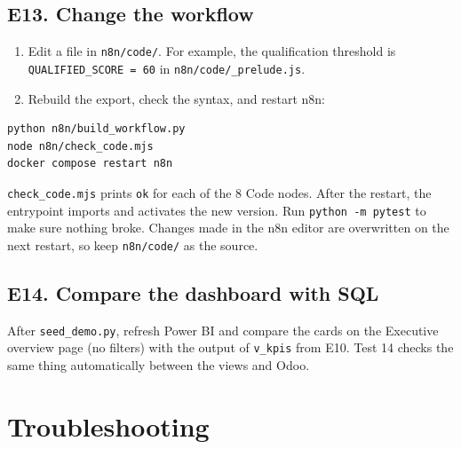 \documentclass[11pt,a4paper]{article}
\newcommand{\f}[1]{\texttt{#1}}
\begin{document}
\subsection{E13. Change the workflow}
\begin{enumerate}
  \item Edit a file in \f{n8n/code/}. For example, the qualification threshold is
        \f{QUALIFIED\_SCORE = 60} in \f{n8n/code/\_prelude.js}.
  \item Rebuild the export, check the syntax, and restart n8n:
\end{enumerate}
\begin{lstlisting}
python n8n/build_workflow.py
node n8n/check_code.mjs
docker compose restart n8n
\end{lstlisting}
\f{check\_code.mjs} prints \f{ok} for each of the 8 Code nodes. After the restart, the entrypoint
imports and activates the new version. Run \f{python -m pytest} to make sure nothing broke. Changes
made in the n8n editor are overwritten on the next restart, so keep \f{n8n/code/} as the source.

\subsection{E14. Compare the dashboard with SQL}
After \f{seed\_demo.py}, refresh Power BI and compare the cards on the Executive overview page (no
filters) with the output of \f{v\_kpis} from E10. Test 14 checks the same thing automatically between
the views and Odoo.

\section{Troubleshooting}
\end{document}
